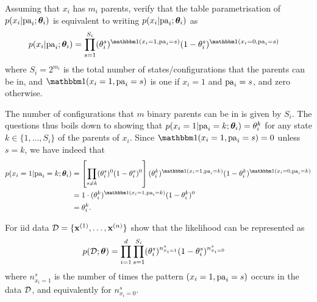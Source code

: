 \begin{exenumerate}
  
\item Assuming that $x_i$ has $m_i$ parents, verify that the table parametrisation of $p(x_i | \mathrm{pa}_i; \boldsymbol{\theta}_i)$ is equivalent to writing $p(x_i | \mathrm{pa}_i; \boldsymbol{\theta}_i)$ as
  \begin{align}
    p(x_i | \pa_i; \thetab_i) &= \prod_{s=1}^{S_i} (\theta_i^s)^{\ind(x_i=1, \pa_i=s)} (1-\theta_i^s)^{\ind(x_i=0, \pa_i=s)} \label{eq:pcond-fac}
  \end{align}
  where $S_i = 2^{m_i}$ is the total number of states/configurations that the
  parents can be in, and $\ind(x_i=1, \pa_i=s)$ is one if $x_i=1$ and $\mathrm{pa}_i=s$, and zero otherwise.
  
  \begin{solution}
    The number of configurations that $m$ binary parents can be in is given by $S_i$. The questions thus boils down to showing that $p(x_i=1 | \mathrm{pa}_i=k; \boldsymbol{\theta}_i) = \theta_i^k$ for any state $k \in \{1, \ldots, S_i\}$ of the parents of $x_i$. Since $\ind(x_i=1, \pa_i=s)=0$ unless $s=k$, we have indeed that
     \begin{align}
       p(x_i = 1| \pa_i = k; \thetab_i) &= \left[\prod_{s \neq k} (\theta_i^s)^0 (1-\theta_i^s)^0\right] (\theta_i^k)^{\ind(x_i=1, \pa_i=k)} (1-\theta_i^k)^{\ind(x_i=0, \pa_i=k)}\\
       &= 1 \cdot  (\theta_i^k)^{\ind(x_i=1, \pa_i=k)} (1-\theta_i^k)^0\\
       & = \theta_i^k.
     \end{align}
    
  \end{solution}
  
\item For iid data $\mathcal{D} = \{\mathbf{x}^{(1)}, \ldots, \mathbf{x}^{(n)}\}$ show that the likelihood can be represented as
  \begin{align}
    p(\mathcal{D}; \boldsymbol{\theta}) & = \prod_{i=1}^d \prod_{s=1}^{S_i}  (\theta_i^s)^{n_{x_i=1}^s} (1-\theta_i^s)^{n_{x_i=0}^s} \label{eq:joint-dag}
  \end{align}
  where $n_{x_i=1}^s$ is the number of times the pattern $(x_i=1, \mathrm{pa}_i=s)$ occurs in the data $\mathcal{D}$, and equivalently for $n_{x_i=0}^s$.
  

\end{exenumerate}

